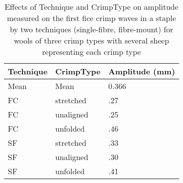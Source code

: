 %

\begin{table}[htp]
\centering
\caption{Effects of Technique and CrimpType on amplitude  measured on the first fice crimp waves in a staple by two techniques (single-fibre, fibre-mount) for wools of three crimp types with several sheep representing each crimp type}
\label{tab:ampl5means}
\vspace{0.1in}
\begin{tabular}{|p{1.0in}|p{1.0in}|p{0.9in}|} \hline
     Technique  & CrimpType & Amplitude (mm) \\  \hline
 Mean &  Mean       & 0.366  \\ \hline
 FC & stretched     & .27          \\
 FC & unaligned     & .25          \\
 FC & unfolded     &  .46          \\ \hline
 SF & stretched     & .33        \\
 SF & unaligned     & .30        \\
 SF & unfolded      & .41        \\ \hline
\end{tabular}
\end{table}

%
